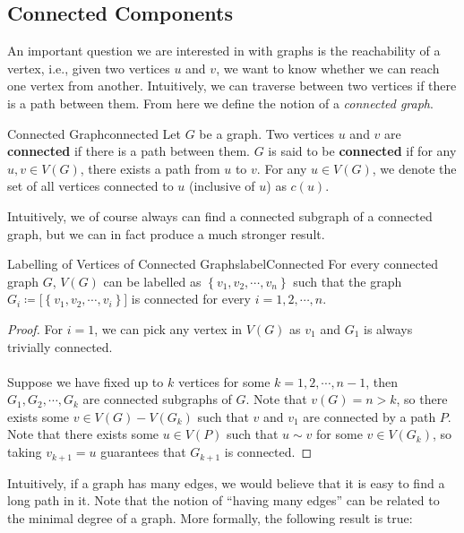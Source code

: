 \documentclass[math, code]{amznotes}
\theoremstyle{remark}
\begin{document}
\subsection{Connected Components}
An important question we are interested in with graphs is the reachability of a vertex, i.e., given two vertices $u$ and $v$, we want to know whether we can reach one vertex from another. Intuitively, we can traverse between two vertices if there is a path between them. From here we define the notion of a \textit{connected graph}.
\begin{dfnbox}{Connected Graph}{connected}
    Let $G$ be a graph. Two vertices $u$ and $v$ are {\color{red} \textbf{connected}} if there is a path between them. $G$ is said to be {\color{red} \textbf{connected}} if for any $u, v \in V(G)$, there exists a path from $u$ to $v$. For any $u \in V(G)$, we denote the set of all vertices connected to $u$ (inclusive of $u$) as $c(u)$.
\end{dfnbox}
Intuitively, we of course always can find a connected subgraph of a connected graph, but we can in fact produce a much stronger result.
\begin{probox}{Labelling of Vertices of Connected Graphs}{labelConnected}
    For every connected graph $G$, $V(G)$ can be labelled as $\left\{v_1, v_2, \cdots, v_n\right\}$ such that the graph~$G_i \coloneqq \bigl[\left\{v_1, v_2, \cdots, v_i\right\}\bigr]$ is connected for every $i = 1, 2, \cdots, n$.
    \tcblower
    \begin{proof}
        For $i = 1$, we can pick any vertex in $V(G)$ as $v_1$ and $G_1$ is always trivially connected.
        \\\\
        Suppose we have fixed up to $k$ vertices for some $k = 1, 2, \cdots, n - 1$, then $G_1, G_2, \cdots, G_k$ are connected subgraphs of $G$. Note that $v(G) = n > k$, so there exists some $v \in V(G) - V(G_k)$ such that $v$ and $v_1$ are connected by a path $P$. Note that there exists some $u \in V(P)$ such that $u \sim v$ for some $v \in V(G_k)$, so taking $v_{k + 1} = u$ guarantees that $G_{k + 1}$ is connected.
    \end{proof}
\end{probox}
Intuitively, if a graph has many edges, we would believe that it is easy to find a long path in it. Note that the notion of ``having many edges'' can be related to the minimal degree of a graph. More formally, the following result is true:
\end{document}
